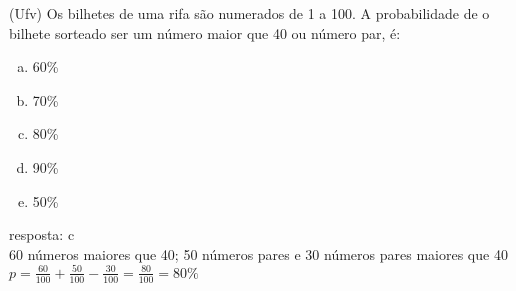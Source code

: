 \begin{ex}
(Ufv) Os bilhetes de uma rifa são numerados de 1 a 100. A probabilidade de o bilhete sorteado ser um número maior que 40 ou número par, é:
   \begin{enumerate}[(a)]
   \item 60\%
   \item 70\%
   \item 80\%
   \item 90\%
   \item 50\%
   \end{enumerate}
     \begin{sol}
      resposta: c \\
      60 números maiores que 40; 50 números pares e 30 números pares maiores que 40 \\ 
      $p=\frac{60}{100}+\frac{50}{100}-\frac{30}{100}=\frac{80}{100}=80\%$
     \end{sol}
\end{ex}